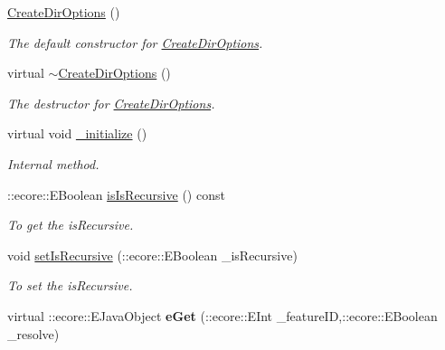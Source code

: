 \begin{DoxyCompactItemize}
\item 
\hypertarget{classFMS__Data_1_1CreateDirOptions_a14ec12d6b163c836295facd135c0e74b}{
\hyperlink{classFMS__Data_1_1CreateDirOptions_a14ec12d6b163c836295facd135c0e74b}{CreateDirOptions} ()}
\label{classFMS__Data_1_1CreateDirOptions_a14ec12d6b163c836295facd135c0e74b}

\begin{DoxyCompactList}\small\item\em The default constructor for \hyperlink{classFMS__Data_1_1CreateDirOptions}{CreateDirOptions}. \item\end{DoxyCompactList}\item 
\hypertarget{classFMS__Data_1_1CreateDirOptions_a276e629c31a1f084b7db06345493dc84}{
virtual \hyperlink{classFMS__Data_1_1CreateDirOptions_a276e629c31a1f084b7db06345493dc84}{$\sim$CreateDirOptions} ()}
\label{classFMS__Data_1_1CreateDirOptions_a276e629c31a1f084b7db06345493dc84}

\begin{DoxyCompactList}\small\item\em The destructor for \hyperlink{classFMS__Data_1_1CreateDirOptions}{CreateDirOptions}. \item\end{DoxyCompactList}\item 
\hypertarget{classFMS__Data_1_1CreateDirOptions_a0667bc02e5c9e95484d914da0c9a16e6}{
virtual void \hyperlink{classFMS__Data_1_1CreateDirOptions_a0667bc02e5c9e95484d914da0c9a16e6}{\_\-initialize} ()}
\label{classFMS__Data_1_1CreateDirOptions_a0667bc02e5c9e95484d914da0c9a16e6}

\begin{DoxyCompactList}\small\item\em Internal method. \item\end{DoxyCompactList}\item 
::ecore::EBoolean \hyperlink{classFMS__Data_1_1CreateDirOptions_ab4a9eef94cceaf1167c5f185d79f6115}{isIsRecursive} () const 
\begin{DoxyCompactList}\small\item\em To get the isRecursive. \item\end{DoxyCompactList}\item 
void \hyperlink{classFMS__Data_1_1CreateDirOptions_a1512ed6aa831cfb55d842e36f22e64de}{setIsRecursive} (::ecore::EBoolean \_\-isRecursive)
\begin{DoxyCompactList}\small\item\em To set the isRecursive. \item\end{DoxyCompactList}\item 
\hypertarget{classFMS__Data_1_1CreateDirOptions_abd96acc6cf9d9524f43f294aa53de9f7}{
virtual ::ecore::EJavaObject {\bfseries eGet} (::ecore::EInt \_\-featureID,::ecore::EBoolean \_\-resolve)}
\label{classFMS__Data_1_1CreateDirOptions_abd96acc6cf9d9524f43f294aa53de9f7}


\end{DoxyCompactItemize}
